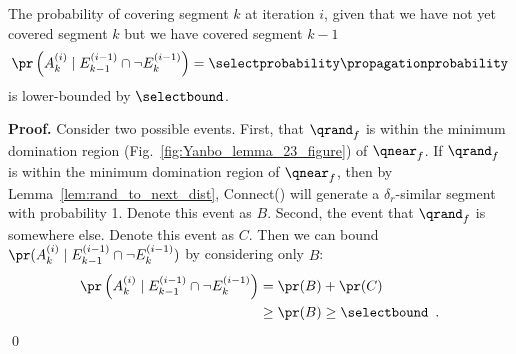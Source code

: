 \begin{lemma}
    The probability of covering segment $k$ at iteration $i$, given that we have not yet covered segment $k$ but we have covered segment $k-1$
    $$\pr\left( A_k^{(i)} \mid E_{k-1}^{(i-1)} \cap \neg E_k^{(i-1)} \right) = \selectprobability \propagationprobability$$
    is lower-bounded by $\selectbound$.
\end{lemma}

\noindent
{\bf Proof.}
Consider two possible events. First, that $\qrand_f$ is within the minimum domination region (Fig.~\ref{fig:Yanbo_lemma_23_figure}) of $\qnear_f$. If $\qrand_f$ is within the minimum domination region of $\qnear_f$, then by Lemma~\ref{lem:rand_to_next_dist}, Connect() will generate a $\delta_r$-similar segment with probability 1. Denote this event as $B$. Second, the event that $\qrand_f$ is somewhere else. Denote this event as $C$. Then we can bound $\pr( A_k^{(i)} \mid E_{k-1}^{(i-1)} \cap \neg E_k^{(i-1)})$ by considering only $B$:
\begin{align*}
    \pr\left( A_k^{(i)} \mid E_{k-1}^{(i-1)} \cap \neg E_k^{(i-1)} \right) 
        &= \pr(B) + \pr(C) \\
        &\geq \pr(B) \geq \selectbound \enspace .
\end{align*}
\qed




